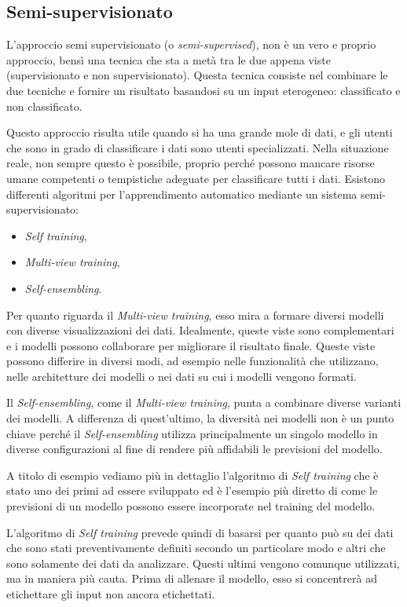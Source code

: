 \documentclass[12pt,italian]{report}
\begin{document}
\subsection{Semi-supervisionato}

L'approccio semi supervisionato (o \emph{semi-supervised}), non è un vero e proprio approccio, bensì una tecnica che sta a metà tra le due appena viste (supervisionato e non supervisionato). Questa tecnica consiste nel combinare le due tecniche e fornire un risultato basandosi su un input eterogeneo: classificato e non classificato.

Questo approccio risulta utile quando si ha una grande mole di dati, e gli utenti che sono in grado di classificare i dati sono utenti specializzati. Nella situazione reale, non sempre questo è possibile, proprio perché possono mancare risorse umane competenti o tempistiche adeguate per classificare tutti i dati. Esistono differenti algoritmi per l'apprendimento automatico mediante un sistema semi-supervisionato:
\begin{itemize}
	\item \emph{Self training},
	\item \emph{Multi-view training},
	\item \emph{Self-ensembling}.
\end{itemize}

Per quanto riguarda il \emph{Multi-view training}, esso mira a formare diversi modelli con diverse visualizzazioni dei dati. Idealmente, queste viste sono complementari e i modelli possono collaborare per migliorare il risultato finale. Queste viste possono differire in diversi modi, ad esempio nelle funzionalità che utilizzano, nelle architetture dei modelli o nei dati su cui i modelli vengono formati.

Il \emph{Self-ensembling}, come il \emph{Multi-view training}, punta a combinare diverse varianti dei modelli. A differenza di quest'ultimo, la diversità nei modelli non è un punto chiave perché il \emph{Self-ensembling} utilizza principalmente un singolo modello in diverse configurazioni al fine di rendere più affidabili le previsioni del modello. 

A titolo di esempio vediamo più in dettaglio l'algoritmo di \emph{Self training} che è stato uno dei primi ad essere sviluppato ed è l'esempio più diretto di come le previsioni di un modello possono essere incorporate nel training del modello.

L'algoritmo di \emph{Self training} prevede quindi di basarsi per quanto può su dei dati che sono stati preventivamente definiti secondo un particolare modo e altri che sono solamente dei dati da analizzare. Questi ultimi vengono comunque utilizzati, ma in maniera più cauta. Prima di allenare il modello, esso si concentrerà ad etichettare gli input non ancora etichettati.
\end{document}
